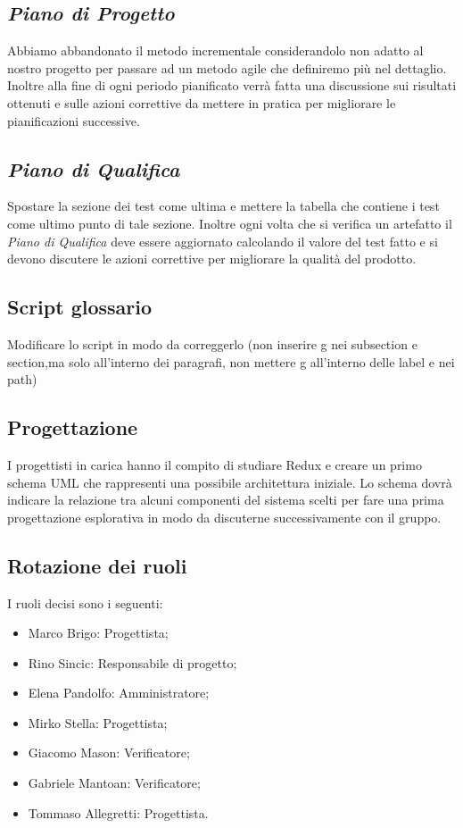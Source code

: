 \subsection{\textit{Piano di Progetto}}
Abbiamo abbandonato il metodo incrementale considerandolo non adatto al nostro progetto per passare ad un metodo 
agile che definiremo più nel dettaglio.
Inoltre alla fine di ogni periodo pianificato verrà fatta una discussione sui risultati ottenuti e sulle azioni 
correttive da mettere in pratica per migliorare le pianificazioni successive.
\subsection{\textit{Piano di Qualifica}}
Spostare la sezione dei test come ultima e mettere la tabella che contiene i test come ultimo punto di tale sezione.
Inoltre ogni volta che si verifica un artefatto il \textit{Piano di Qualifica} deve essere aggiornato calcolando il valore del 
test fatto e si devono discutere le azioni correttive per migliorare la qualità del prodotto.
\subsection{Script glossario}
Modificare lo script in modo da correggerlo (non inserire g nei subsection e section,ma solo all’interno dei paragrafi,
non mettere g all’interno delle label e nei path)
\subsection{Progettazione}
I progettisti in carica hanno il compito di studiare Redux e creare un primo schema UML che rappresenti una possibile 
architettura iniziale.
Lo schema dovrà indicare la relazione tra alcuni componenti del sistema scelti per fare una prima progettazione esplorativa
in modo da discuterne successivamente con il gruppo.
\subsection{Rotazione dei ruoli}
I ruoli decisi sono i seguenti:
\begin{itemize}
    \item Marco Brigo: Progettista;
    \item Rino Sincic: Responsabile di progetto;
    \item Elena Pandolfo: Amministratore;
    \item Mirko Stella: Progettista;
    \item Giacomo Mason: Verificatore;
    \item Gabriele Mantoan: Verificatore;
    \item Tommaso Allegretti: Progettista.
\end{itemize}
